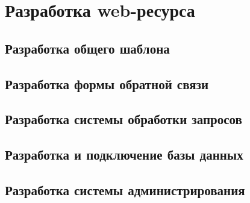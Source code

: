 \section{Разработка web-ресурса}
    \subsection{Разработка общего шаблона}
    \subsection{Разработка формы обратной связи}
    \subsection{Разработка системы обработки запросов}
    \subsection{Разработка и подключение базы данных}
    \subsection{Разработка системы администрирования}

\clearpage
